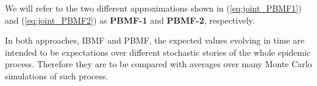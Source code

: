 We will refer to the two different approximations shown in (\ref{eq:joint_PBMF1}) and (\ref{eq:joint_PBMF2}) as {\bf PBMF-1} and {\bf PBMF-2}, respectively. 

In both approaches, IBMF and PBMF, the expected values evolving in time are intended to be expectations over different stochastic stories of the whole epidemic process. Therefore they are to be compared with averages over many Monte Carlo simulations of such process.

% 
